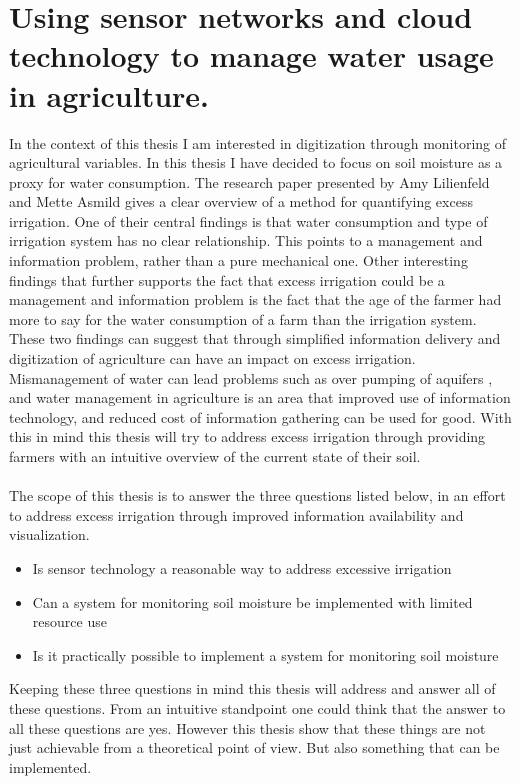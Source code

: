 \documentclass[]{uiophd}
\begin{document}
\section{Using sensor networks and cloud technology to manage water usage in agriculture.}

In the context of this thesis I am interested in digitization through monitoring of agricultural variables. In this thesis I have decided to focus on soil moisture as a proxy for water consumption. The research paper presented by Amy Lilienfeld and Mette Asmild gives a clear overview of a method for quantifying excess irrigation. One of their central findings is that water consumption and type of irrigation system has no clear relationship. This points to a management and information problem, rather than a pure mechanical one. Other interesting findings that further supports the fact that excess irrigation could be a management and information problem is the fact that the age of the farmer had more to say for the water consumption of a farm than the irrigation system. These two findings can suggest that through simplified information delivery and digitization of agriculture can have an impact on excess irrigation. Mismanagement of water can lead problems such as over pumping of aquifers \cite{LILIENFELD200773}, and water management in agriculture is an area that improved use of information technology, and reduced cost of information gathering can be used for good. With this in mind this thesis will try to address excess irrigation through providing farmers with an intuitive overview of the current state of their soil. 
\\\\
The scope of this thesis is to answer the three questions listed below, in an effort to address excess irrigation through improved information availability and visualization.


\begin{itemize}
  \item Is sensor technology a reasonable way to address excessive irrigation
  \item Can a system for monitoring soil moisture be implemented with limited resource use
  \item Is it practically possible to implement a system for monitoring soil moisture 
\end{itemize}
Keeping these three questions in mind this thesis will address and answer all of these questions. From an intuitive standpoint one could think that the answer to all these questions are yes. However this thesis show that these things are not just achievable from a theoretical point of view. But also something that can be implemented.
\end{document}
